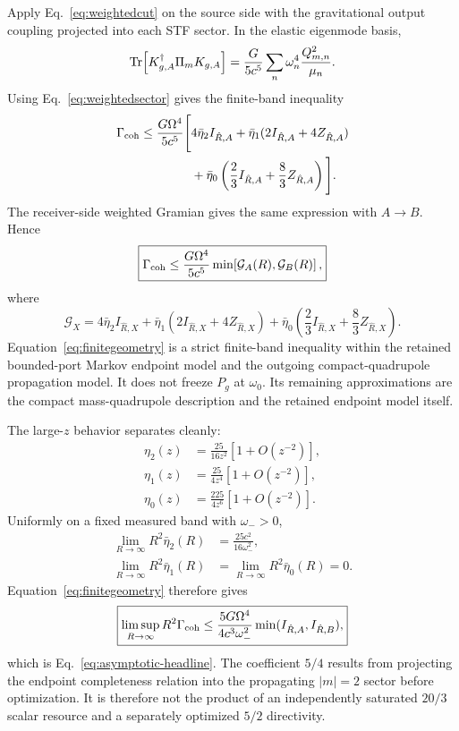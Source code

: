 Apply Eq.~\eqref{eq:weightedcut} on the source side with the gravitational output coupling projected into each STF sector. In the elastic eigenmode basis,
\begin{equation}
\operatorname{Tr}\!\left[
K_{g,A}^\dagger\Pi_m K_{g,A}
\right]
=
\frac{G}{5c^5}
\sum_n\omega_n^4
\frac{Q_{m,n}^2}{\mu_n}.
\label{eq:sectortrace}
\end{equation}
Using Eq.~\eqref{eq:weightedsector} gives the finite-band inequality
\begin{align}
\Gamma_{\rm coh}
\le\frac{G\Omega^4}{5c^5}
\Bigg[
&4\bar\eta_2 I_{\hat R,A}
+\bar\eta_1(2I_{\hat R,A}+4Z_{\hat R,A})\nonumber\\
&+\bar\eta_0\left(\frac23I_{\hat R,A}
+\frac83Z_{\hat R,A}\right)
\Bigg].
\label{eq:finitegeometryA}
\end{align}
The receiver-side weighted Gramian gives the same expression with $A\rightarrow B$. Hence
\begin{equation}
\boxed{
\Gamma_{\rm coh}
\le
\frac{G\Omega^4}{5c^5}
\min\!\left[\mathcal G_A(R),\mathcal G_B(R)\right],
}
\label{eq:finitegeometry}
\end{equation}
where
\begin{equation}
\mathcal G_X
=
4\bar\eta_2 I_{\hat R,X}
+\bar\eta_1(2I_{\hat R,X}+4Z_{\hat R,X})
+\bar\eta_0\left(\frac23I_{\hat R,X}+\frac83Z_{\hat R,X}\right).
\end{equation}
Equation~\eqref{eq:finitegeometry} is a strict finite-band inequality within the retained bounded-port Markov endpoint model and the outgoing compact-quadrupole propagation model. It does not freeze $P_g$ at $\omega_0$. Its remaining approximations are the compact mass-quadrupole description and the retained endpoint model itself.

The large-$z$ behavior separates cleanly:
\begin{align}
\eta_2(z)&=\frac{25}{16z^2}\left[1+O(z^{-2})\right],\\
\eta_1(z)&=\frac{25}{4z^4}\left[1+O(z^{-2})\right],\\
\eta_0(z)&=\frac{225}{4z^6}\left[1+O(z^{-2})\right].
\end{align}
Uniformly on a fixed measured band with $\omega_->0$,
\begin{align}
\lim_{R\to\infty}R^2\bar\eta_2(R)
&=\frac{25c^2}{16\omega_-^2},\\
\lim_{R\to\infty}R^2\bar\eta_1(R)
&=\lim_{R\to\infty}R^2\bar\eta_0(R)=0.
\end{align}
Equation~\eqref{eq:finitegeometry} therefore gives
\begin{equation}
\boxed{
\limsup_{R\rightarrow\infty}
R^2\Gamma_{\rm coh}
\le
\frac{5G\Omega^4}{4c^3\omega_-^2}
\min(I_{\hat R,A},I_{\hat R,B}),
}
\end{equation}
which is Eq.~\eqref{eq:asymptotic-headline}. The coefficient $5/4$ results from projecting the endpoint completeness relation into the propagating $|m|=2$ sector before optimization. It is therefore not the product of an independently saturated $20/3$ scalar resource and a separately optimized $5/2$ directivity.

